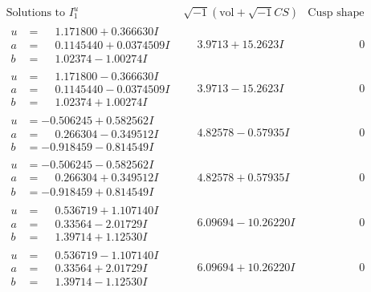 \documentclass[1p]{elsarticle_modified}
\theoremstyle{definition}
\newcommand{\I}{\sqrt{-1}}
\begin{document}
$$\begin{array}{c|c|c}
\text{Solutions to }I^u_{1}& \I (\text{vol} + \sqrt{-1}CS) & \text{Cusp shape}\\
 \hline 
\begin{aligned}
u &= \phantom{-}1.171800 + 0.366630 I \\
a &= \phantom{-}0.1145440 + 0.0374509 I \\
b &= \phantom{-}1.02374 - 1.00274 I\end{aligned}
 & \phantom{-}3.9713 + 15.2623 I & \phantom{-0.000000 } 0 \\ \hline\begin{aligned}
u &= \phantom{-}1.171800 - 0.366630 I \\
a &= \phantom{-}0.1145440 - 0.0374509 I \\
b &= \phantom{-}1.02374 + 1.00274 I\end{aligned}
 & \phantom{-}3.9713 - 15.2623 I & \phantom{-0.000000 } 0 \\ \hline\begin{aligned}
u &= -0.506245 + 0.582562 I \\
a &= \phantom{-}0.266304 - 0.349512 I \\
b &= -0.918459 - 0.814549 I\end{aligned}
 & \phantom{-}4.82578 - 0.57935 I & \phantom{-0.000000 } 0 \\ \hline\begin{aligned}
u &= -0.506245 - 0.582562 I \\
a &= \phantom{-}0.266304 + 0.349512 I \\
b &= -0.918459 + 0.814549 I\end{aligned}
 & \phantom{-}4.82578 + 0.57935 I & \phantom{-0.000000 } 0 \\ \hline\begin{aligned}
u &= \phantom{-}0.536719 + 1.107140 I \\
a &= \phantom{-}0.33564 - 2.01729 I \\
b &= \phantom{-}1.39714 + 1.12530 I\end{aligned}
 & \phantom{-}6.09694 - 10.26220 I & \phantom{-0.000000 } 0 \\ \hline\begin{aligned}
u &= \phantom{-}0.536719 - 1.107140 I \\
a &= \phantom{-}0.33564 + 2.01729 I \\
b &= \phantom{-}1.39714 - 1.12530 I\end{aligned}
 & \phantom{-}6.09694 + 10.26220 I & \phantom{-0.000000 } 0 \\ \hline\begin{aligned}

\end{aligned}
\end{array}$$
\end{document}
